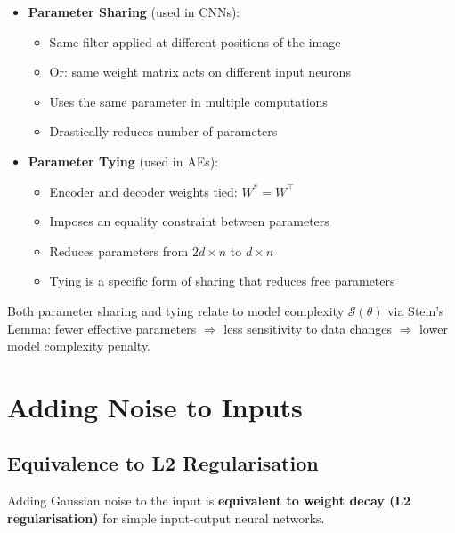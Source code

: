\documentclass[12pt,a4paper]{article}
\newcommand{\Reg}{\mathcal{S}}
\begin{document}
\begin{itemize}
  \item \textbf{Parameter Sharing} (used in CNNs):
    \begin{itemize}
      \item Same filter applied at different positions of the image
      \item Or: same weight matrix acts on different input neurons
      \item Uses the same parameter in multiple computations
      \item Drastically reduces number of parameters
    \end{itemize}

  \item \textbf{Parameter Tying} (used in AEs):
    \begin{itemize}
      \item Encoder and decoder weights tied: $W^* = W^\top$
      \item Imposes an equality constraint between parameters
      \item Reduces parameters from $2d\times n$ to $d\times n$
      \item Tying is a specific form of sharing that reduces free parameters
    \end{itemize}
\end{itemize}

\begin{notebox}
Both parameter sharing and tying relate to model complexity $\Reg(\theta)$ via Stein's Lemma: fewer effective parameters $\Rightarrow$ less sensitivity to data changes $\Rightarrow$ lower model complexity penalty.
\end{notebox}

\section{Adding Noise to Inputs}

\subsection{Equivalence to L2 Regularisation}

Adding Gaussian noise to the input is \textbf{equivalent to weight decay (L2 regularisation)} for simple input-output neural networks.
\end{document}
